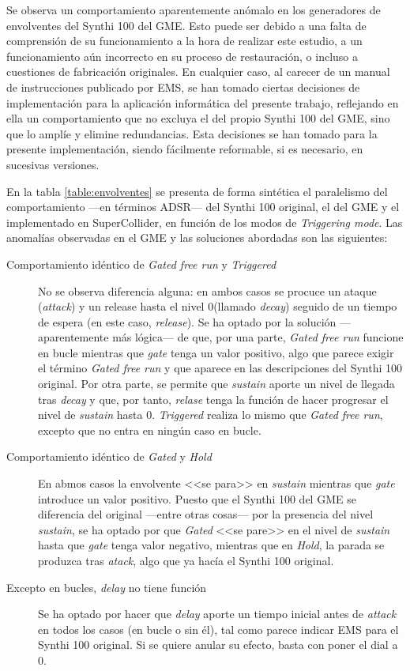 Se observa un comportamiento aparentemente anómalo en los generadores de envolventes del Synthi 100 del GME. Esto puede ser debido a una falta de comprensión de su funcionamiento a la hora de realizar este estudio, a un funcionamiento aún incorrecto en su proceso de restauración, o incluso a cuestiones de fabricación originales. En cualquier caso, al carecer de un manual de instrucciones publicado por EMS, se han tomado ciertas decisiones de implementación para la aplicación informática del presente trabajo, reflejando en ella un comportamiento que no excluya el del propio Synthi 100 del GME, sino que lo amplíe y elimine redundancias. Esta decisiones se han tomado para la presente implementación, siendo fácilmente reformable, si es necesario, en sucesivas versiones.

En la tabla \ref{table:envolventes} se presenta de forma sintética el paralelismo del comportamiento ---en términos ADSR--- del Synthi 100 original, el del GME y el implementado en SuperCollider, en función de los modos de \textit{Triggering mode}. Las anomalías observadas en el GME y las soluciones abordadas son las siguientes:
\begin{description}
	\item[Comportamiento idéntico de \textit{Gated free run} y \textit{Triggered}] No se observa diferencia alguna: en ambos casos se procuce un ataque (\textit{attack}) y un release hasta el nivel 0(llamado \textit{decay}) seguido de un tiempo de espera (en este caso, \textit{release}). Se ha optado por la solución ---aparentemente más lógica--- de que, por una parte, \textit{Gated free run} funcione en bucle mientras que \textit{gate} tenga un valor positivo, algo que parece exigir el término \textit{Gated free run} y que aparece en las descripciones del Synthi 100 original. Por otra parte, se permite que \textit{sustain} aporte un nivel de llegada tras \textit{decay} y que, por tanto, \textit{relase} tenga la función de hacer progresar el nivel de \textit{sustain} hasta 0. \textit{Triggered} realiza lo mismo que \textit{Gated free run}, excepto que no entra en ningún caso en bucle.
	\item[Comportamiento idéntico de \textit{Gated} y \textit{Hold}] En abmos casos la envolvente <<se para>> en \textit{sustain} mientras que \textit{gate} introduce un valor positivo. Puesto que el Synthi 100 del GME se diferencia del original ---entre otras cosas--- por la presencia del nivel \textit{sustain}, se ha optado por que \textit{Gated} <<se pare>> en el nivel de \textit{sustain} hasta que \textit{gate} tenga valor negativo, mientras que en \textit{Hold}, la parada se produzca tras \textit{atack}, algo que ya hacía el Synthi 100 original.
	\item[Excepto en bucles, \textit{delay} no tiene función] Se ha optado por hacer que  \textit{delay}  aporte un tiempo inicial antes de \textit{attack} en todos los casos (en bucle o sin él), tal como parece indicar EMS para el Synthi 100 original. Si se quiere anular su efecto, basta con poner el dial a 0.
\end{description}

